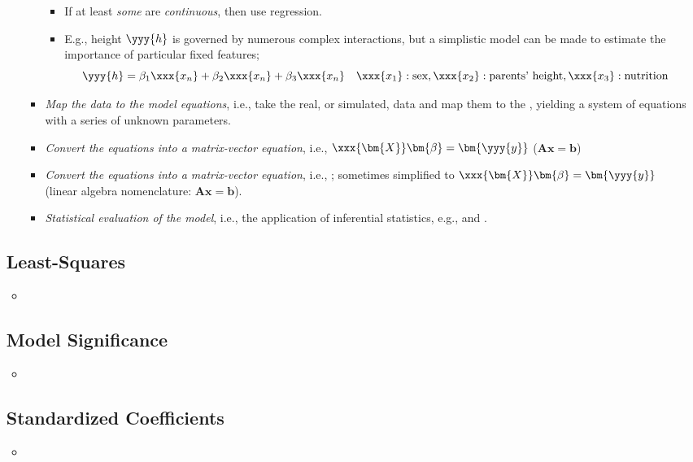 \begin{itemize}
\begin{itemize}
\begin{itemize}
\begin{itemize}
          \item If at least \emph{some}  are \emph{continuous}, then use regression.
          \item E.g., height \(\yyy{h}\) is governed by numerous complex interactions, but a simplistic model can be made to estimate the importance of particular fixed features;
          \[%
          \yyy{h} = \beta_1 \xxx{x_n} + \beta_2 \xxx{x_n} + \beta_3  \xxx{x_n} \quad \xxx{x_1}: \text{sex},\xxx{x_2}: \text{parents' height}, \xxx{x_3}: \text{nutrition}
          \]%
          
        \end{itemize}
      \item \emph{Map the data to the model equations}, i.e.,  take the real, or simulated, data and map them to the ,  yielding a system of equations with a series of unknown parameters. 
      \item \emph{Convert the equations into a matrix-vector equation}, i.e., \(\xxx{\bm{X}}\bm{\beta} = \bm{\yyy{y}}\) (\(\bm{Ax}=\bm{b}\))
      \item \emph{Convert the equations into a matrix-vector equation}, i.e., \hyperref[Subsection: Multiple Regression]{}; sometimes simplified to \(\xxx{\bm{X}}\bm{\beta} = \bm{\yyy{y}}\) (linear algebra nomenclature: \(\bm{Ax}=\bm{b}\)).
      \item \emph{Statistical evaluation of the model}, i.e., the application of inferential statistics, e.g., \hyperref[Subsection: Model Significance]{} and \hyperref[Subsection: Standardized Coefficients]{}.
    \end{itemize}
  \end{itemize}

  \subsection{Least-Squares}
  \begin{itemize}
    \item 
  \end{itemize}

  \subsection{Model Significance}
  \begin{itemize}
    \item 
  \end{itemize}

  \subsection{Standardized Coefficients}
  \begin{itemize}
    \item 
  \end{itemize}
  
\end{itemize}

